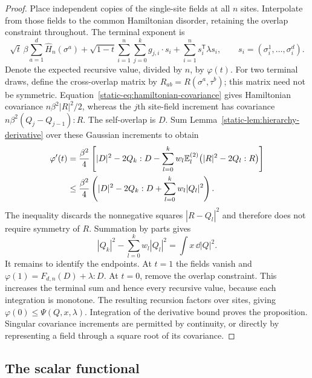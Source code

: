 \begin{proof}
Place independent copies of the single-site fields at all $n$ sites.
Interpolate from those fields to the common Hamiltonian disorder,
retaining the overlap constraint throughout. The terminal exponent is
\[
 \sqrt t\,\beta\sum_{a=1}^d\widehat H_n(\sigma^a)
 +\sqrt{1-t}\sum_{i=1}^n\sum_{j=0}^kg_{j,i}\cdot s_i
 +\sum_{i=1}^ns_i^{\mathsf T}\lambda s_i,
 \qquad s_i=(\sigma_i^1,\ldots,\sigma_i^d).
\]
Denote the expected recursive value, divided by $n$, by $\varphi(t)$.
For two terminal draws, define the cross-overlap matrix by
$R_{ab}=R(\sigma^a,\tau^b)$; this matrix need not be symmetric.
Equation~\eqref{static-eq:hamiltonian-covariance} gives Hamiltonian
covariance $n\beta^2|R|^2/2$, whereas the $j$th site-field increment
has covariance $n\beta^2(Q_j-Q_{j-1}):R$. The self-overlap is $D$.
Sum Lemma~\ref{static-lem:hierarchy-derivative} over these Gaussian
increments to obtain
\begin{align*}
 \varphi'(t)
 &=\frac{\beta^2}{4}\left[
 |D|^2-2Q_k:D
 -\sum_{l=0}^kw_l\mathbb E_l^{(2)}
       \bigl(|R|^2-2Q_l:R\bigr)\right]\\
 &\le\frac{\beta^2}{4}
       \left(|D|^2-2Q_k:D+\sum_{l=0}^kw_l|Q_l|^2\right).
\end{align*}
The inequality discards the nonnegative squares $|R-Q_l|^2$ and
therefore does not require symmetry of $R$. Summation by parts gives
\[
 |Q_k|^2-\sum_{l=0}^kw_l|Q_l|^2=\int x\,\dd|Q|^2.
\]
It remains to identify the endpoints. At $t=1$ the fields vanish and
$\varphi(1)=F_{d,n}(D)+\lambda:D$. At $t=0$, remove the overlap
constraint. This increases the terminal sum and hence every recursive
value, because each integration is monotone. The resulting recursion
factors over sites, giving $\varphi(0)\le\Psi(Q,x,\lambda)$.
Integration of the derivative bound proves the proposition. Singular
covariance increments are permitted by continuity, or directly by
representing a field through a square root of its covariance.
\end{proof}

\subsection{The scalar functional}


